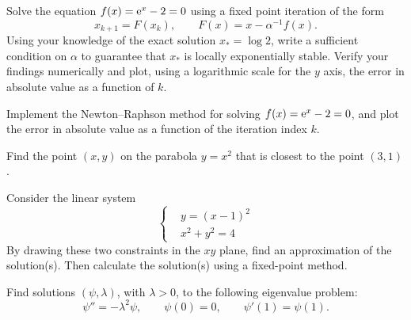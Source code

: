 \begin{exercise}
    Solve the equation $f(x) = \mathrm e^x - 2 = 0$ using a fixed point iteration of the form
    \[
        x_{k+1} = F(x_k), \qquad
        F(x) = x - \alpha^{-1} f(x).
    \]
    Using your knowledge of the exact solution $x_* = \log 2$,
    write a sufficient condition on $\alpha$ to guarantee that $x_*$ is locally exponentially stable.
    Verify your findings numerically and plot,
    using a logarithmic scale for the $y$ axis,
    the error in absolute value as a function of $k$.
\end{exercise}

\begin{exercise}
    Implement the Newton--Raphson method for solving $f(x) = \mathrm e^x - 2 = 0$,
    and plot the error in absolute value as a function of the iteration index $k$.
\end{exercise}

\begin{exercise}
    Find the point $(x, y)$ on the parabola $y = x^2$ that is closest to the point $(3, 1)$.
\end{exercise}

\begin{exercise}
    Consider the linear system
    \begin{equation*}
        \left \{
            \begin{aligned}
                &y = (x-1)^2 \\
                &x^2 + y^2 = 4
            \end{aligned}
        \right.
    \end{equation*}
    By drawing these two constraints in the $xy$ plane,
    find an approximation of the solution(s).
    Then calculate the solution(s) using a fixed-point method.
\end{exercise}

\begin{exercise}
    Find solutions $(\psi, \lambda)$, with $\lambda > 0$,
    to the following eigenvalue problem:
    \[
        \psi'' = - \lambda^2 \psi, \qquad \psi(0) = 0, \qquad \psi'(1) = \psi(1).
    \]
\end{exercise}

